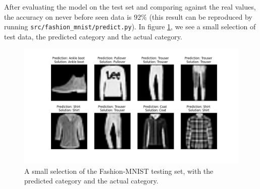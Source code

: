 \documentclass[../main.tex]{subfiles}
\begin{document}
After evaluating the model on the test set and comparing against the real values, the accuracy on never before seen data is $92\%$ (this result can be reproduced by running \verb|src/fashion_mnist/predict.py|). In figure \ref{fig:cnn_fashion_predictions}, we see a small selection of test data, the predicted category and the actual category.

\begin{figure}[H]
    \centering
    \includegraphics[width=\textwidth]{assets/cnn_fashion_predictions.png}
    \caption{A small selection of the Fashion-MNIST testing set, with the predicted category and the actual category.}
    \label{fig:cnn_fashion_predictions}
\end{figure}
\end{document}
